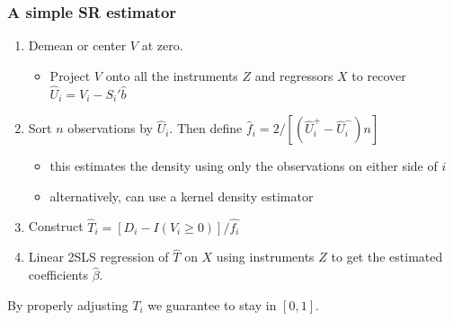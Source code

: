 \begin{frame}
       \frametitle{A simple SR estimator}
       \begin{enumerate}
       \item Demean or center $V$ at zero. 
       \begin{itemize}
              \item Project $V$ onto all the instruments $Z$ and regressors $X$ to recover $\hat U_i = V_i - S_i'\hat b$  
       \end{itemize}
       \item Sort $n$ observations by $\hat U_i$. Then define $\hat f_i = 2/ \left[(\hat U_i^+ - \hat U_i^-) n \right]$ 
       \begin{itemize}
              \item this estimates the density using only the observations on either side of $i$
              \item alternatively, can use a kernel density estimator
       \end{itemize}
       \item Construct $\hat{T}_i = [D_i -  I(V_i \geq 0)]/ \hat{f_i}$
       \item Linear 2SLS regression of $\hat{T}$ on $X$ using instruments $Z$ to get the estimated coefficients $\hat{\beta}$.
       \end{enumerate}
       By properly adjusting $T_i$ we guarantee to stay in $[0,1]$.
\end{frame}
       


